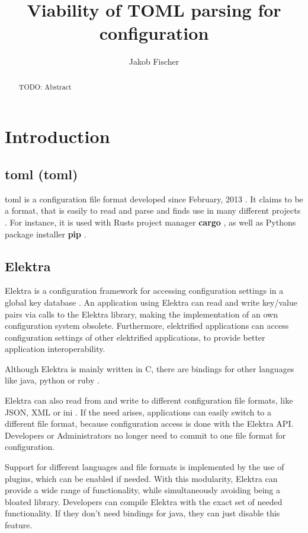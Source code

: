 \documentclass[12pt]{report}
\title{Viability of TOML parsing for configuration}
\author{Jakob Fischer}
\begin{document}
\maketitle

\begin{abstract}
TODO: Abstract
\end{abstract}

\chapter{Introduction}


\section{\acrshort{toml} (\acrlong{toml})}
\acrshort{toml} is a configuration file format developed since February, 2013 \cite{tomlcontrib}.
It claims to be a format, that is easily to read and parse \cite{tomlreadme} and finds use in many different projects \cite{tomlwiki}.
For instance, it is used with Rusts project manager \textbf{cargo} \cite{cargogit}, as well as Pythons package installer \textbf{pip} \cite{piprefguide}.

\section{Elektra}
Elektra is a configuration framework for accessing configuration settings in a global key database \cite{elektramain}.
An application using Elektra can read and write key/value pairs via calls to the Elektra library, making the implementation of an own configuration system obsolete.
Furthermore, elektrified applications can access configuration settings of other elektrified applications, to provide better application interoperability.

Although Elektra is mainly written in C, there are bindings for other languages like java, python or ruby \cite{elektrabindings}.

Elektra can also read from and write to different configuration file formats, like JSON, XML or ini \cite{elektrastorage}.
If the need arises, applications can easily switch to a different file format, because configuration access is done with the Elektra API.
Developers or Administrators no longer need to commit to one file format for configuration.

Support for different languages and file formats is implemented by the use of plugins, which can be enabled if needed.
With this modularity, Elektra can provide a wide range of functionality, while simultaneously avoiding being a bloated library.
Developers can compile Elektra with the exact set of needed functionality. If they don't need bindings for java, they can just disable this feature.
\end{document}
